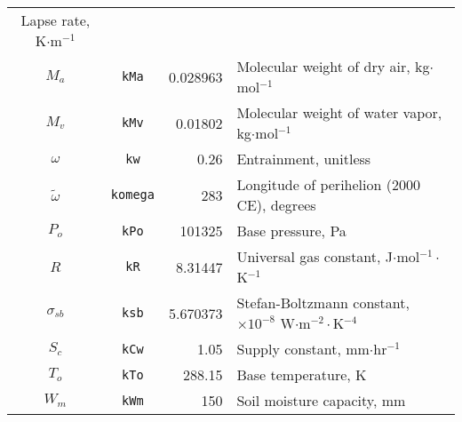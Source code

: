 \begin{longtable}{c c r p{6cm}}
        Lapse rate, K$\cdot$m$^{-1}$ 
        \parencite{allen73} \\
    $M_a$ & \texttt{kMa} & 0.028963 &
        Molecular weight of dry air, kg$\cdot$mol$^{-1}$ 
        \parencite{tsilingiris08} \\
    $M_v$ & \texttt{kMv} & 0.01802 &
        Molecular weight of water vapor, kg$\cdot$mol$^{-1}$
        \parencite{tsilingiris08} \\
	$\omega$ & \texttt{kw} & 0.26 & 
        Entrainment, unitless 
        \parencite{lhomme97,priestley72} \\    
    $\tilde{\omega}$ & \texttt{komega} & 283 & 
        Longitude of perihelion (2000 CE), degrees 
        \parencite{berger78} \\
    $P_o$ & \texttt{kPo} & 101325 &
        Base pressure, Pa 
        \parencite{allen73} \\
    $R$ & \texttt{kR} & 8.31447 &
        Universal gas constant, J$\cdot$mol$^{-1}\cdot$K$^{-1}$ 
        \parencite{moldover88} \\
    $\sigma_{sb}$ & \texttt{ksb} & 5.670373 &
        Stefan-Boltzmann constant, $\times 10^{-8}$ 
        W$\cdot$m$^{-2}\cdot$K$^{-4}$ \\
    $S_c$ & \texttt{kCw} & 1.05 & 
        Supply constant, mm$\cdot$hr$^{-1}$  
        \parencite{federer82} \\
    $T_o$ & \texttt{kTo} & 288.15 &
        Base temperature, K 
        \parencite{berberansantos97} \\
    $W_m$ & \texttt{kWm} & 150 &
        Soil moisture capacity, mm  
        \parencite{cramer88} \\
        \hline
\end{longtable}


